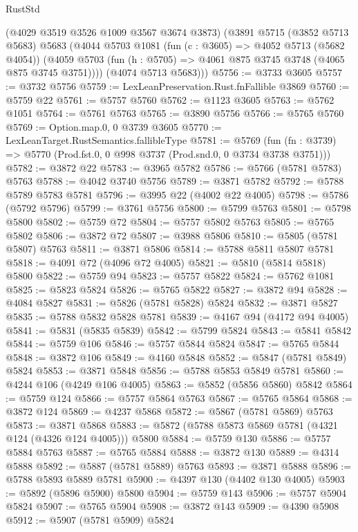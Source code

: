 \begin{lexlean}{RustStd}
\begin{coremodule}
      (@4029 @3519 @3526 @1009 @3567 @3674 @3873)
      (@3891
        @5715
        (@3852 @5713 @5683)
        @5683
        (@4044
          @5703
          @1081
          (fun (c : @3605) => @4052 @5713 (@5682 @4054))
          (@4059 @5703 (fun (h : @5705) => @4061 @875 @3745 @3748 (@4065 @875 @3745 @3751))))
        (@4074 @5713 @5683)))
@5756 := @3733 @3605
@5757 := @3732 @5756
@5759 := LexLeanPreservation.Rust.fnFallible @3869
@5760 := @5759 @22
@5761 := @5757 @5760
@5762 := @1123 @3605
@5763 := @5762 @1051
@5764 := @5761 @5763
@5765 := @3890 @5756
@5766 := @5765 @5760
@5769 := Option.map.{0, 0} @3739 @3605
@5770 := LexLeanTarget.RustSemantics.fallibleType
@5781 := @5769
    (fun (fn : @3739) => @5770 (Prod.fst.{0, 0} @998 @3737 (Prod.snd.{0, 0} @3734 @3738 @3751)))
@5782 := @3872 @22
@5783 := @3965 @5782
@5786 := @5766 (@5781 @5783) @5763
@5788 := @4042 @3740 @5756
@5789 := @3871 @5782
@5792 := @5788 @5789 @5783 @5781
@5796 := @3995 @22 (@4002 @22 @4005)
@5798 := @5786 (@5792 @5796)
@5799 := @3761 @5756
@5800 := @5799 @5763
@5801 := @5798 @5800
@5802 := @5759 @72
@5804 := @5757 @5802 @5763
@5805 := @5765 @5802
@5806 := @3872 @72
@5807 := @3988 @5806
@5810 := @5805 (@5781 @5807) @5763
@5811 := @3871 @5806
@5814 := @5788 @5811 @5807 @5781
@5818 := @4091 @72 (@4096 @72 @4005)
@5821 := @5810 (@5814 @5818) @5800
@5822 := @5759 @94
@5823 := @5757 @5822
@5824 := @5762 @1081
@5825 := @5823 @5824
@5826 := @5765 @5822
@5827 := @3872 @94
@5828 := @4084 @5827
@5831 := @5826 (@5781 @5828) @5824
@5832 := @3871 @5827
@5835 := @5788 @5832 @5828 @5781
@5839 := @4167 @94 (@4172 @94 @4005)
@5841 := @5831 (@5835 @5839)
@5842 := @5799 @5824
@5843 := @5841 @5842
@5844 := @5759 @106
@5846 := @5757 @5844 @5824
@5847 := @5765 @5844
@5848 := @3872 @106
@5849 := @4160 @5848
@5852 := @5847 (@5781 @5849) @5824
@5853 := @3871 @5848
@5856 := @5788 @5853 @5849 @5781
@5860 := @4244 @106 (@4249 @106 @4005)
@5863 := @5852 (@5856 @5860) @5842
@5864 := @5759 @124
@5866 := @5757 @5864 @5763
@5867 := @5765 @5864
@5868 := @3872 @124
@5869 := @4237 @5868
@5872 := @5867 (@5781 @5869) @5763
@5873 := @3871 @5868
@5883 := @5872 (@5788 @5873 @5869 @5781 (@4321 @124 (@4326 @124 @4005))) @5800
@5884 := @5759 @130
@5886 := @5757 @5884 @5763
@5887 := @5765 @5884
@5888 := @3872 @130
@5889 := @4314 @5888
@5892 := @5887 (@5781 @5889) @5763
@5893 := @3871 @5888
@5896 := @5788 @5893 @5889 @5781
@5900 := @4397 @130 (@4402 @130 @4005)
@5903 := @5892 (@5896 @5900) @5800
@5904 := @5759 @143
@5906 := @5757 @5904 @5824
@5907 := @5765 @5904
@5908 := @3872 @143
@5909 := @4390 @5908
@5912 := @5907 (@5781 @5909) @5824

\end{coremodule}
\end{lexlean}
